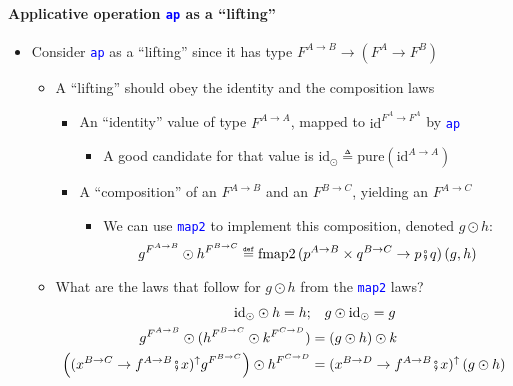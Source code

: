 \paragraph{Applicative operation \texttt{\textcolor{blue}{\footnotesize{}ap}}
as a ``lifting''}
\begin{itemize}
\item \vspace{-0.18cm}Consider \texttt{\textcolor{blue}{\footnotesize{}ap}}
as a ``lifting'' since it has type{\footnotesize{} $F^{A\rightarrow B}\rightarrow\left(F^{A}\rightarrow F^{B}\right)$}{\footnotesize\par}
\begin{itemize}
\item A ``lifting'' should obey the identity and the composition laws
\begin{itemize}
\item An ``identity'' value of type $F^{A\rightarrow A}$, mapped to $\text{id}^{F^{A}\rightarrow F^{A}}$
by \texttt{\textcolor{blue}{\footnotesize{}ap}} 
\begin{itemize}
\item A good candidate for that value is $\text{id}_{\odot}\triangleq\text{pure}\left(\text{id}^{A\rightarrow A}\right)$
\end{itemize}
\item A ``composition'' of an $F^{A\rightarrow B}$ and an $F^{B\rightarrow C}$,
yielding an $F^{A\rightarrow C}$
\begin{itemize}
\item We can use \texttt{\textcolor{blue}{\footnotesize{}map2}} to implement
this composition, denoted $g\odot h$:
\[
g^{F^{A\rightarrow B}}\odot h^{F^{B\rightarrow C}}\triangleq\text{fmap2}\,(p^{A\rightarrow B}\times q^{B\rightarrow C}\rightarrow p\bef q)\left(g,h\right)
\]
\end{itemize}
\end{itemize}
\item What are the laws that follow for $g\odot h$ from the \texttt{\textcolor{blue}{\footnotesize{}map2}}
laws?{\footnotesize{}
\begin{align*}
\text{id}_{\odot}\odot h=h; & \quad g\odot\text{id}_{\odot}=g\\
g^{F^{A\rightarrow B}}\odot(h^{F^{B\rightarrow C}}\odot k^{F^{C\rightarrow D}}) & =\left(g\odot h\right)\odot k\\
\left((x^{B\rightarrow C}\rightarrow f^{A\rightarrow B}\bef x)^{\uparrow}g^{F^{B\rightarrow C}}\right)\odot h^{F^{C\rightarrow D}} & =(x^{B\rightarrow D}\rightarrow f^{A\rightarrow B}\bef x)^{\uparrow}\left(g\odot h\right)\\

\end{align*}}
\end{itemize}
\end{itemize}
